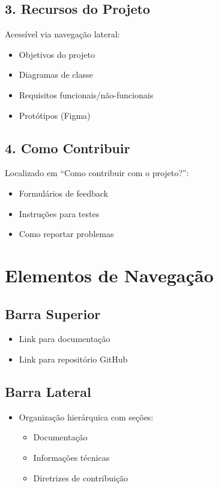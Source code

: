 \subsection{3. Recursos do Projeto}
Acessível via navegação lateral:
\begin{itemize}
    \item Objetivos do projeto
    \item Diagramas de classe
    \item Requisitos funcionais/não-funcionais
    \item Protótipos (Figma)
\end{itemize}

\subsection{4. Como Contribuir}
Localizado em ``Como contribuir com o projeto?'':
\begin{itemize}
    \item Formulários de feedback
    \item Instruções para testes
    \item Como reportar problemas
\end{itemize}

\section{Elementos de Navegação}

\subsection{Barra Superior}
\begin{itemize}
    \item Link para documentação
    \item Link para repositório GitHub
\end{itemize}

\subsection{Barra Lateral}
\begin{itemize}
    \item Organização hierárquica com seções:
    \begin{itemize}
        \item Documentação
        \item Informações técnicas
        \item Diretrizes de contribuição
    \end{itemize}
\end{itemize}

